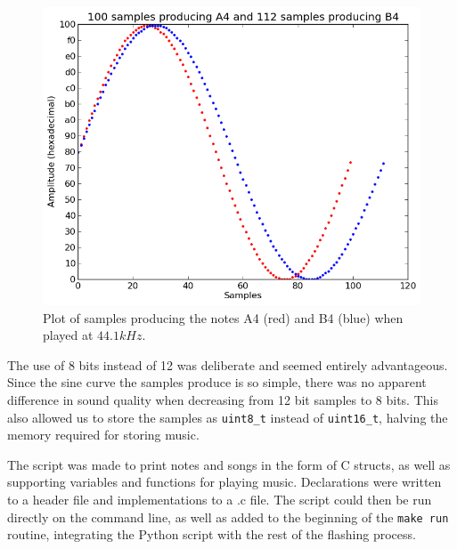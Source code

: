 \begin{figure}[h!]
\includegraphics[width=\linewidth]{img/sample_plot.png}
\caption{Plot of samples producing the notes A4 (red) and B4 (blue) when played at $44.1kHz$.\label{fig:sample_plot}}
\label{fig:A4samples}
\end{figure}

The use of 8 bits instead of 12 was deliberate and seemed entirely advantageous. Since the sine curve the samples produce is so simple, there was no apparent difference in sound quality when decreasing from 12 bit samples to 8 bits. This also allowed us to store the samples as \texttt{uint8\_t} instead of \texttt{uint16\_t}, halving the memory required for storing music.

The script was made to print notes and songs in the form of C structs, as well as supporting variables and functions for playing music. Declarations were written to a header file and implementations to a .c file. The script could then be run directly on the command line, as well as added to the beginning of the \texttt{make run} routine, integrating the Python script with the rest of the flashing process.


